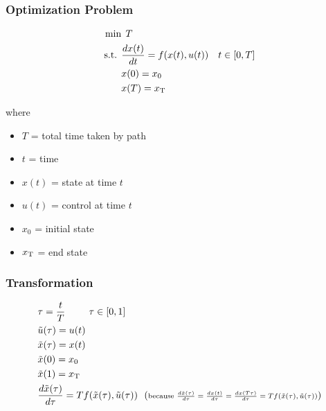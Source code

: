 \documentclass{beamer}
\newcommand{\ut}[1]{\ensuremath{\tilde{#1}}}
\begin{document}
\begin{frame}
\frametitle{Optimization Problem}


\begin{small}
\begin{align*}
\min  & \: \:T \\
\mbox{s.t. } & \frac{dx(t)}{dt} = f(x(t),u(t))  &t \in [0,T] \\
& x(0) = x_0 \\
& x(T) = x_{\scriptsize\mbox{T}}
\end{align*}

where 
\begin{itemize}
\item $T$ = total time taken by path 
\item $t$ = time 
\item $x(t)$ = state at time $t$ 
\item $u(t)$ = control at time $t$ 
\item $x_0$ = initial state
\item $x_{\scriptsize\mbox{T}}$ = end state
\end{itemize} 

\end{small}

\end{frame} %
\begin{frame}
\frametitle{Transformation}

\begin{align*}
& \tau = \frac{t}{T}  \:\:\:\:\:\:\:\:\:\:\: \tau \in [0,1] \\
& \ut{u}(\tau) = u(t) \\
& \ut{x}(\tau) = x(t) \\
& \ut{x}(0) = x_0 \\
& \ut{x}(1) = x_{\scriptsize\mbox{T}} \\
& \frac{d\ut{x}(\tau)}{d\tau} = Tf(\ut{x}(\tau),\ut{u}(\tau)) \: \: \: (\scriptsize\mbox{because $ \frac{d\ut{x}(\tau)}{d\tau} = \frac{dx(t)}{d\tau}  =   \frac{dx(T\tau)}{d\tau} = Tf(\ut{x}(\tau),\ut{u}(\tau))$})
\end{align*}
         
\end{frame} %
\end{document}
